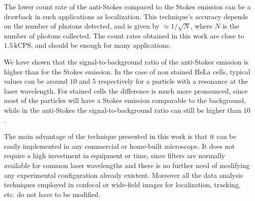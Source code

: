 \documentclass[journal=nalefd,manuscript=letter]{achemso}
\begin{document}
The lower count rate of the anti-Stokes compared to the Stokes emission can be a
drawback in such applications as localization\cite{Sahl2013}. This technique's
accuracy depends on the number of photons detected, and is given by $\approx
1/\sqrt{N}$, where $N$ is the number of photons collected. The count rates
obtained in this work are close to $1.5\,\textrm{kCPS}$, and should be enough
for many applications. 

We have shown that the signal-to-background ratio of the anti-Stokes emission is
higher than for the Stokes emission. In the case of non stained HeLa cells,
typical values can be around $10$ and $5$ respectively for a particle with a
resonance at the laser wavelength. For stained cells the difference is
much more pronounced, since most of the particles will have a Stokes emission
comparable to the background, while in the anti-Stokes the signal-to-background
ratio can still be higher than $10$.

The main advantage of the technique presented in this work is that it can be
easily implemented in any commercial or home-built microscope. It does not
require a high investment in equipment or time, since filters are
normally available for common laser wavelengths and there is no further need of
modifying any experimental configuration already existent. Moreover all the data
analysis techniques employed in confocal or wide-field images for localization,
tracking, etc. do not have to be modified. 

{}
\end{document}
